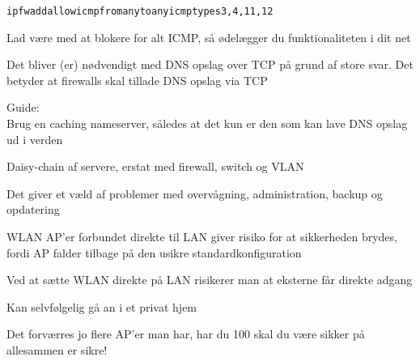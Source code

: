 \documentclass[Screen16to9,17pt]{foils}
\begin{document}

\begin{alltt}
ipfw add allow icmp from any to any icmptypes 3,4,11,12
\end{alltt}

\begin{list1}
\item Lad være med at blokere for alt ICMP, så ødelægger du funktionaliteten i dit net
\vskip 1cm
\item \end{list1}


\begin{list1}
\item Det bliver (er) nødvendigt med DNS opslag over TCP på grund af store svar. Det betyder at firewalls skal tillade DNS opslag via TCP
\vskip 1cm
\item
\item Guide:\\
Brug en caching nameserver, således at det kun er den som kan lave DNS opslag ud i verden

\end{list1}



\begin{list1}
\item Daisy-chain af servere, erstat med firewall, switch og VLAN
\vskip 1cm
\item Det giver et væld af problemer med overvågning, administration, backup og opdatering
\end{list1}



\begin{list1}
\item WLAN AP'er forbundet direkte til LAN giver risiko for at sikkerheden brydes, fordi AP falder tilbage på den usikre standardkonfiguration
\vskip 1cm
\item Ved at sætte WLAN direkte på LAN risikerer man at eksterne får direkte adgang
\item Kan selvfølgelig gå an i et privat hjem
\item Det forværres jo flere AP'er man har, har du 100 skal du være sikker på allesammen er sikre!
\end{list1}
\end{document}
